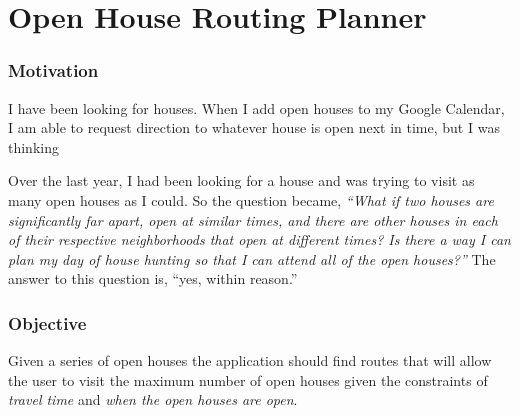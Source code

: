 \documentclass[letterpaper,11pt]{report}
\theoremstyle{definition}
\theoremstyle{definition}
\begin{document}
\normalem       %


%
%

%
%

%
%

%
%

%
%

%
%

%
%

%
%


\chapter{Open House Routing Planner}
\subsection{Motivation}
I have been looking for houses. When I add open houses to my Google Calendar, I am able to request direction to whatever house is open next in time, but I was thinking

Over the last year, I had been looking for a house and was trying to visit as many open houses as I could. So the question became, \emph{``What if two houses are significantly far apart, open at similar times, and there are other houses in each of their respective neighborhoods that open at different times? Is there a way I can plan my day of house hunting so that I can attend all of the open houses?''} The answer to this question is, ``yes, within reason.''

\subsection{Objective}
Given a series of open houses the application should find routes that will allow the user to visit the maximum number of open houses given the constraints of \emph{travel time} and \emph{when the open houses are open}.
\end{document}
